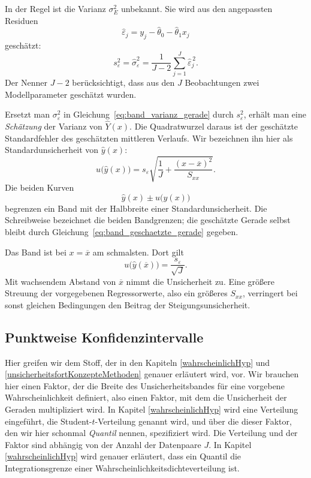 In der Regel ist die Varianz $\sigma_E^2$ unbekannt. Sie wird aus den
angepassten Residuen
\begin{equation}
  \widehat{\varepsilon}_j
  =y_j-\widehat{\theta}_0-\widehat{\theta}_1 x_j
\end{equation}
geschätzt:
\begin{equation}
  s_\varepsilon^2=\widehat{\sigma}_\varepsilon^2
  =\frac{1}{J-2}
    \sum_{j=1}^{J}\widehat{\varepsilon}_j^{\,2}.
  \label{eq:band_residualvarianz}
\end{equation}
Der Nenner $J-2$ berücksichtigt, dass aus den $J$ Beobachtungen zwei
Modellparameter geschätzt wurden.

Ersetzt man $\sigma_\varepsilon^2$ in
Gleichung~\eqref{eq:band_varianz_gerade} durch $s_\varepsilon^2$, erhält man
eine \emph{Schätzung} der Varianz von $\widehat{Y}(x)$.
Die Quadratwurzel daraus ist der geschätzte Standardfehler des
geschätzten mittleren Verlaufs. Wir bezeichnen ihn hier als
Standardunsicherheit von $\widehat{y}(x)$:
\begin{equation}
  u\bigl(\widehat{y}(x)\bigr)
  =
  s_\varepsilon\sqrt{
    \frac{1}{J}+\frac{(x-\overline{x})^2}{S_{xx}}
  }.
  \label{eq:band_standardunsicherheit}
\end{equation}
Die beiden Kurven
\begin{equation}
  \widehat{y}(x)\pm u\bigl(\widehat{y}(x)\bigr)
  \label{eq:band_einfache_standardunsicherheit}
\end{equation}
begrenzen ein Band mit der Halbbreite einer Standardunsicherheit.
Die Schreibweise bezeichnet die beiden Bandgrenzen; die geschätzte
Gerade selbst bleibt durch
Gleichung~\eqref{eq:band_geschaetzte_gerade} gegeben.

Das Band ist bei $x=\overline{x}$ am schmalsten. Dort gilt
\begin{equation}
  u\bigl(\widehat{y}(\overline{x})\bigr)
  =\frac{s_\varepsilon}{\sqrt{J}}.
\end{equation}
Mit wachsendem Abstand von $\overline{x}$ nimmt die Unsicherheit zu.
Eine größere Streuung der vorgegebenen Regressorwerte, also ein
größeres $S_{xx}$, verringert bei sonst gleichen Bedingungen den
Beitrag der Steigungsunsicherheit.

\subsection{Punktweise Konfidenzintervalle}

Hier greifen wir dem Stoff, der in den Kapiteln \ref{wahrscheinlichHyp} und \ref{unsicherheitsfortKonzepteMethoden} genauer erläutert wird, vor. Wir brauchen hier einen Faktor, der die Breite des Unsicherheitsbandes für eine vorgebene Wahrscheinlichkeit definiert, also einen Faktor, mit dem die Unsicherheit der Geraden multipliziert wird. In Kapitel \ref{wahrscheinlichHyp} wird eine Verteilung eingeführt, die Student-$t$-Verteilung genannt wird, und über die dieser Faktor, den wir hier schonmal \textsl{Quantil} nennen, spezifiziert wird. Die Verteilung und der Faktor sind abhängig von der Anzahl der Datenpaare $J$. In Kapitel \ref{wahrscheinlichHyp} wird genauer erläutert, dass ein Quantil die Integrations\-grenze einer Wahr\-schein\-lich\-keits\-dichte\-ver\-teilung ist.

